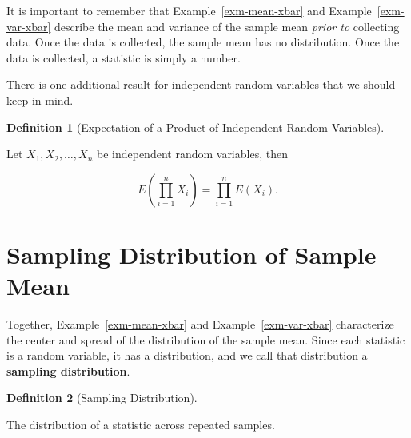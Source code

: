 \documentclass[
  letterpaper,
  DIV=11,
  numbers=noendperiod]{scrreprt}
\theoremstyle{plain}
\theoremstyle{definition}
\newtheorem{definition}{Definition}[chapter]
\theoremstyle{definition}
\theoremstyle{remark}
\begin{document}
\begin{tcolorbox}[enhanced jigsaw, toprule=.15mm, left=2mm, title=\textcolor{quarto-callout-warning-color}{\faExclamationTriangle}\hspace{0.5em}{Warning}, opacityback=0, toptitle=1mm, leftrule=.75mm, colbacktitle=quarto-callout-warning-color!10!white, opacitybacktitle=0.6, titlerule=0mm, breakable, colframe=quarto-callout-warning-color-frame, arc=.35mm, coltitle=black, bottomtitle=1mm, rightrule=.15mm, colback=white, bottomrule=.15mm]

It is important to remember that Example~\ref{exm-mean-xbar} and
Example~\ref{exm-var-xbar} describe the mean and variance of the sample
mean \emph{prior to} collecting data. Once the data is collected, the
sample mean has no distribution. Once the data is collected, a statistic
is simply a number.

\end{tcolorbox}

There is one additional result for independent random variables that we
should keep in mind.

\begin{definition}[Expectation of a Product of Independent Random
Variables]\protect\hypertarget{def-product-expectations}{}\label{def-product-expectations}

Let \(X_1, X_2, \dotsc, X_n\) be independent random variables, then

\[E\left(\prod_{i=1}^n X_i\right) = \prod_{i=1}^{n} E\left(X_i\right).\]

\end{definition}

\hypertarget{sampling-distribution-of-sample-mean}{%
\section{Sampling Distribution of Sample
Mean}\label{sampling-distribution-of-sample-mean}}

Together, Example~\ref{exm-mean-xbar} and Example~\ref{exm-var-xbar}
characterize the center and spread of the distribution of the sample
mean. Since each statistic is a random variable, it has a distribution,
and we call that distribution a \textbf{sampling distribution}.

\begin{definition}[Sampling
Distribution]\protect\hypertarget{def-sampling-distribution}{}\label{def-sampling-distribution}

The distribution of a statistic across repeated samples.

\end{definition}
\end{document}
